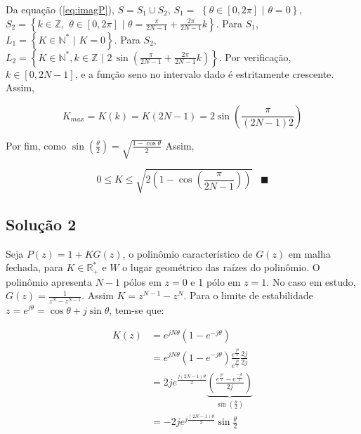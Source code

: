 \documentclass[twoside, fleqn]{article}
\begin{document}
    Da equação (\ref{eq:imagP}), $S = S_1 \cup S_2$, $S_1 = $ $ \left\{\theta \in [0, 2 \pi] \,\, \Bigr| \,\, \theta = 0\right\}$, $S_2 = \left\{k \in \mathbb{Z}, \,\, \theta \in [0, 2 \pi] \,\, \Bigr| \,\, \theta = \frac{\pi}{2N - 1} + \frac{2 \pi}{2N - 1} k\right\}$. Para $S_1$, $L_1 = \left\{K \in \mathbb{N}^* \,\, \Bigr| \,\, K = 0\right\}$. Para $S_2$, $L_2 = \left\{K \in \mathbb{N}^*, k \in \mathbb{Z} \,\, \Bigr| \,\, 2 \, \sin\left(\frac{\pi}{2N-1} + \frac{2 \pi}{2N-1} k\right)\right\}$. Por verificação, $k \in [0, 2N -1]$, e a função seno no intervalo dado é estritamente crescente. Assim, 
    
        \begin{equation}
            K_{max} = K(k) = K(2N - 1) = 2 \sin\left(\frac{\pi}{(2N - 1) 2}\right)
        \end{equation}
    
    Por fim, como $\sin(\frac{\theta}{2}) = \sqrt{\frac{1 - \cos{\theta}}{2}}$ Assim,
    
        \begin{equation}
            0 \leq K \leq \sqrt{2 \left(1 - \cos\left(\frac{\pi}{2N - 1}\right)\right)} \hspace{10pt} \blacksquare
        \end{equation}

\subsection*{Solução 2}

    Seja $P(z) = 1 + K G(z)$, o polinômio característico de $G(z)$ em malha fechada, para $K \in \mathbb{R}^*_{+}$ e $W$ o lugar geométrico das raízes do polinômio. O polinômio apresenta $N-1$ pólos em $z = 0$ e 1 pólo em $z = 1$. No caso em estudo, $G(z) = \frac{1}{z^{N} - z^{N-1}}$.  Assim $K = z^{N - 1} - z^N$. Para o limite de estabilidade $z = e^{j\theta} = \cos{\theta} + j \sin{\theta}$, tem-se que:
    
    \begin{equation}
        \begin{split}
            K(z) & = e^{j N \theta} \left(1 - e^{-j \theta}\right) \\
             & = e^{j N \theta} \left(1 - e^{-j \theta}\right)  \frac{e^{\frac{j\theta}{2}}}{e^{\frac{j\theta}{2}}} \frac{2j}{2j} \\
             & = 2 j e^{\frac{j (2N - 1) \theta}{2}} \underbrace{\left(\frac{e^{\frac{j \theta}{2}} - e^{\frac{- j \theta}{2}}}{2 j}\right)}_{\sin(\frac{\theta}{2})} \\
             & = -2 j e^{j \frac{(2N - 1) \theta}{2}} \sin{\frac{\theta}{2}}
        \end{split}    
    \end{equation}
    
\end{document}
